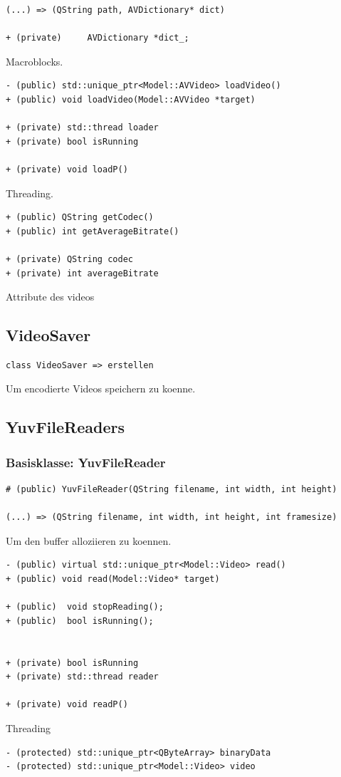\documentclass{scrartcl}
\begin{document}
{\begin{verbatim}
(...) => (QString path, AVDictionary* dict)

+ (private) 	AVDictionary *dict_;
\end{verbatim}
Macroblocks.
\begin{verbatim}
- (public) std::unique_ptr<Model::AVVideo> loadVideo()
+ (public) void loadVideo(Model::AVVideo *target)

+ (private) std::thread loader
+ (private) bool isRunning

+ (private) void loadP()
\end{verbatim}
Threading.
\begin{verbatim}
+ (public) QString getCodec()
+ (public) int getAverageBitrate()

+ (private) QString codec
+ (private) int averageBitrate
\end{verbatim}
Attribute des videos
\subsection{VideoSaver}
\begin{verbatim}
class VideoSaver => erstellen
\end{verbatim}
Um encodierte Videos speichern zu koenne.
\subsection{YuvFileReaders}
\subsubsection{Basisklasse: YuvFileReader}
\begin{verbatim}
# (public) YuvFileReader(QString filename, int width, int height)

(...) => (QString filename, int width, int height, int framesize)
\end{verbatim}
Um den buffer alloziieren zu koennen.

\begin{verbatim}
- (public) virtual std::unique_ptr<Model::Video> read()
+ (public) void read(Model::Video* target)

+ (public)	void stopReading();
+ (public)	bool isRunning();
	
	
+ (private) bool isRunning
+ (private) std::thread reader

+ (private) void readP()
\end{verbatim}
Threading
\begin{verbatim}
- (protected) std::unique_ptr<QByteArray> binaryData
- (protected) std::unique_ptr<Model::Video> video


\end{verbatim}}
\end{document}
